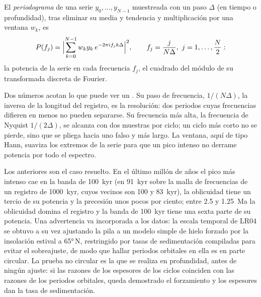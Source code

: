 \begin{definition}[Periodograma]\label{def:b3:sequence-stratigraphy:periodogram}
El \emph{periodograma} de una serie $y_0, \dots, y_{N-1}$
muestreada con un paso $\Delta$ (en tiempo o profundidad), tras eliminar su media y
tendencia y multiplicación por una ventana $w_k$, es
\[
P(f_j) = \Bigl|\sum_{k=0}^{N-1} w_k y_k\, e^{-2\pi i f_j k\Delta}\Bigr|^2,
\qquad f_j = \frac{j}{N\Delta},\ j = 1, \dots, \frac N2:
\]
la potencia de la serie en cada frecuencia $f_j$, el cuadrado del módulo de
su transformada discreta de Fourier.
\end{definition}

Dos números acotan lo que puede ver un . Su paso de frecuencia, $1/(N\Delta)$,
la inversa de la longitud del registro, es la resolución: dos periodos cuyas
frecuencias difieren en menos no pueden separarse. Su frecuencia más alta, la
frecuencia de Nyquist $1/(2\Delta)$, se alcanza con dos muestras por ciclo; un
ciclo más corto no se pierde, sino que se pliega hacia uno falso y más largo. La ventana,
aquí de tipo Hann, suaviza los extremos de la serie para que un pico intenso no
derrame potencia por todo el espectro.


Los  anteriores son el caso resuelto. En el último millón de años el pico más intenso
cae en la banda de \qty{100}{kyr} (en \qty{91}{kyr} sobre la malla de frecuencias
de un registro de \qty{1000}{kyr}, cuyos vecinos son 100 y \qty{83}{kyr}),
la oblicuidad tiene un tercio de su potencia y la precesión unos pocos por ciento;
entre 2.5 y \qty{1.25}{Ma} la oblicuidad domina el registro y la
banda de \qty{100}{kyr} tiene una sexta parte de su potencia. Una advertencia va incorporada a los
datos: la escala temporal de LR04 se obtuvo a su vez ajustando la pila a un modelo simple
de hielo forzado por la insolación estival a \ang{65}\,N, restringido por tasas de sedimentación compiladas
para evitar el sobreajuste, de modo que hallar periodos orbitales en ella
es en parte circular. La prueba no circular es la que se realiza en profundidad,
antes de ningún ajuste: si las razones de los espesores de los ciclos coinciden con las
razones de los periodos orbitales, queda demostrado el forzamiento y los espesores dan la
tasa de sedimentación.

